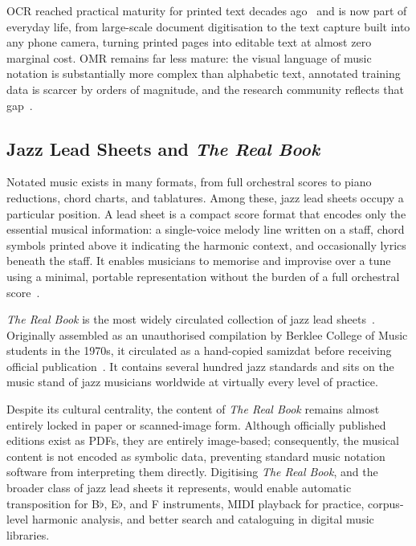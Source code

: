 OCR reached practical maturity for printed text decades ago~\cite{smithTesseractOCR2007} and
is now part of everyday life, from large-scale document digitisation to the text capture built
into any phone camera, turning printed pages into editable text at almost zero marginal cost.
OMR remains far less mature: the visual language of music
notation is substantially more complex than alphabetic text, annotated training data is
scarcer by orders of magnitude, and the research community reflects that
gap~\cite{shatriOPTICALMUSICRECOGNITION}.

\subsection{Jazz Lead Sheets and \textit{The Real Book}}

Notated music exists in many formats, from full orchestral scores to piano reductions,
chord charts, and tablatures. Among these, jazz lead sheets occupy a particular position.
A lead sheet is a compact score format that encodes only the essential musical
information: a single-voice melody line written on a staff, chord symbols printed above it
indicating the harmonic context, and occasionally lyrics beneath the staff. It enables
musicians to memorise and improvise over a tune using a minimal, portable representation
without the burden of a full orchestral score~\cite{reedHonorsLeadSheets2018}.

\textit{The Real Book} is the most widely circulated collection of jazz lead
sheets~\cite{martinezSevillaJazzLeadSheets2025}. Originally assembled as an unauthorised
compilation by Berklee College of Music students in the 1970s, it circulated as a
hand-copied samizdat before receiving official publication~\cite{kernfeldStoryFakeBooks2006}. It contains several hundred
jazz standards and sits on the music stand of jazz musicians worldwide at virtually every
level of practice.

Despite its cultural centrality, the content of \textit{The Real Book} remains almost
entirely locked in paper or scanned-image form. Although officially published editions
exist as PDFs, they are entirely image-based; consequently, the musical content is not
encoded as symbolic data, preventing standard music notation software from interpreting
them directly. Digitising \textit{The Real Book}, and the broader class of jazz lead
sheets it represents, would enable automatic transposition for B\(\flat\), E\(\flat\),
and F instruments, MIDI playback for practice, corpus-level harmonic analysis, and better
search and cataloguing in digital music libraries.

